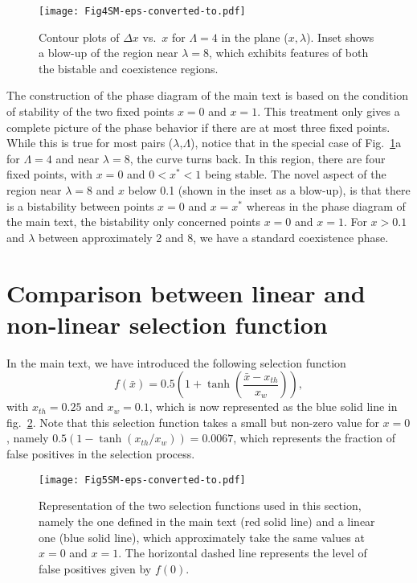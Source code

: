 \documentclass[twocolumn,showpacs,floatfix]{revtex4-1}
\newcommand{\be}{\begin{equation}}
\newcommand{\ee}{\end{equation}}
\begin{document}
\begin{thebibliography}{99}
\begin{widetext}
\begin{figure}
\begin{center}
\texttt{[image: Fig4SM-eps-converted-to.pdf]}
\end{center}
\caption{Contour plots of $\Delta x$ vs.~$x$ for $\Lambda=4$ in the plane ($x,\lambda$). 
Inset shows a blow-up of the region near $\lambda=8$, which exhibits features of both the bistable and coexistence regions.}
\label{fig:L2}
\end{figure}
The construction of the phase diagram of the main text is based on the condition of stability of the two 
fixed points $x=0$ and $x=1$. 
This treatment only gives a complete picture of the phase behavior if there are at most three fixed points. 
While this is true for most pairs ($\lambda$,$\Lambda$), notice that in the special case of Fig.~\ref{fig:L2}a 
for $\Lambda=4$ and near $\lambda=8$, the curve turns back. 
In this region, there are four fixed points, with $x=0$ and $0<x^{*}<1$ being stable.
The novel aspect of the region near $\lambda=8$ and $x$ below 0.1 (shown in the inset as a blow-up), 
is that there is a bistability between points $x=0$
and $x=x^*$ whereas in the phase diagram of the main text, the bistability only concerned points $x=0$ and $x=1$. 
For $x>0.1$ and $\lambda$ between approximately 2 and 8, we have a standard coexistence phase.



\section{Comparison between linear and non-linear selection function}


In the main text, we have introduced the following selection function
\be
f(\bar{x})=0.5 \left(1+\tanh \left( \frac{\bar{x}-x_{th}}{x_w} \right) \right),\label{fsel}
\ee
with $x_{th}=0.25$ and $x_w=0.1$, which is now represented as the blue solid line in fig.~\ref{fig:select}.
Note that this selection function takes a small but non-zero
value for $x=0$, namely $0.5 ( 1 - \tanh (x_{th}/x_{w}) )= 0.0067$, which
represents the fraction of false positives in the selection process. 

\begin{figure}[htb]
\begin{center}
\texttt{[image: Fig5SM-eps-converted-to.pdf]}
\end{center}
\caption{Representation of the two selection functions used in this section, namely the one defined in the main text (red solid line) and 
a linear one (blue solid line), which approximately take the same values at $x=0$ and $x=1$. The horizontal dashed line represents the level 
of false positives given by $f(0)$.}
\label{fig:select}
\end{figure}


\end{widetext}
\end{thebibliography}
\end{document}
